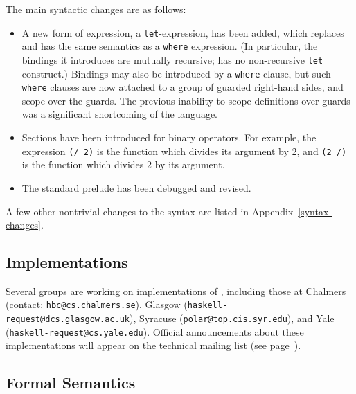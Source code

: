 \noindent
The main syntactic changes are as follows:
\begin{itemize}
\item
A new form of expression, a \mbox{\tt let}-expression,
has been added, which replaces and has the same semantics as a \mbox{\tt where}
expression.  (In particular, the bindings it introduces are mutually
recursive; \Haskell{} has no non-recursive \mbox{\tt let} construct.)
Bindings may also be introduced by a \mbox{\tt where} clause, but such
\mbox{\tt where} clauses are now attached to a group of guarded right-hand
sides, and scope over the guards.  The previous inability to scope
definitions over guards was a significant shortcoming of the language.

\item
Sections
have been introduced for binary operators.  For example, the
expression \mbox{\tt (/\ 2)} is the function which divides its argument by 2,
and \mbox{\tt (2\ /)} is the function which divides 2 by its argument.

\item
The standard prelude has been debugged and revised.


\end{itemize}

\noindent
A few other nontrivial changes to the syntax are listed in
Appendix~\ref{syntax-changes}.

\subsection*{Implementations}\label{implementors}

Several groups are working on implementations of \Haskell{}, including
those at Chalmers (contact: \mbox{\tt hbc@cs.chalmers.se}), Glasgow
(\mbox{\tt haskell-request@dcs.glasgow.ac.uk}), Syracuse (\mbox{\tt polar@top.cis.syr.edu}), and Yale
(\mbox{\tt haskell-request@cs.yale.edu}).  Official announcements about these
implementations will appear on the \Haskell{} technical mailing list
(see page~\pageref{haskell-mailing-list}).

\subsection*{Formal Semantics}

